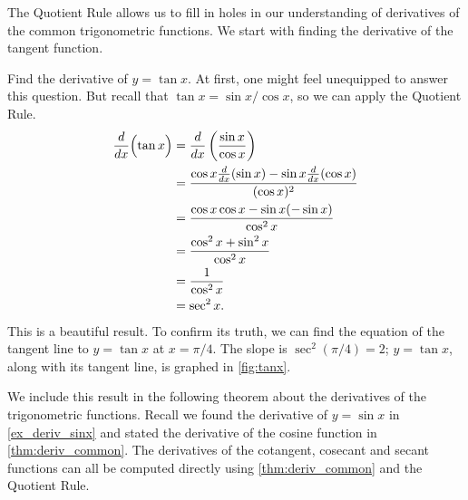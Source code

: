 The Quotient Rule allows us to fill in holes in our understanding of derivatives of the common trigonometric functions. We start with finding the derivative of the tangent function.

\begin{example}\label{ex_der_tan}
Find the derivative of $y=\tan x$.
\solution
At first, one might feel unequipped to answer this question. But recall that $\tan x = \sin x/\cos x$, so we can apply the Quotient Rule.
\begin{align*}
	\frac{d}{dx}\Bigl(\tan x\Bigr)
	&= \frac{d}{dx}\left(\frac{\sin x}{\cos x}\right) \\
	& = \frac{\cos x\frac{d}{dx}(\sin x)-\sin x\frac{d}{dx}(\cos x)}{(\cos x)^2} \\
	&= \frac{\cos x \cos x - \sin x (-\sin x)}{\cos^2 x} \\
	&= \frac{\cos^2x+\sin^2x}{\cos^2x}\\
	&= \frac{1}{\cos^2x} \\
	&= \sec ^2 x.
\end{align*}
This is a beautiful result. To confirm its truth, we can find the equation of the tangent line to $y=\tan x$ at $x=\pi/4$. The slope is $\sec^2(\pi/4) = 2$; $y=\tan x$, along with its tangent line, is graphed in \autoref{fig:tanx}.
\end{example}

We include this result in the following theorem about the derivatives of the trigonometric functions. Recall we found the derivative of $y=\sin x$ in \autoref{ex_deriv_sinx} and stated the derivative of the cosine function in \autoref{thm:deriv_common}. The derivatives of the cotangent, cosecant and secant functions can all be computed directly using \autoref{thm:deriv_common} and the Quotient Rule.

